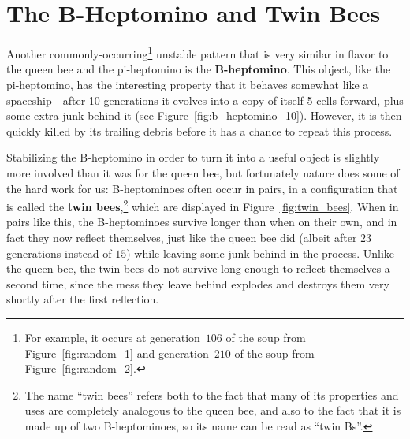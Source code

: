 \section{The B-Heptomino and Twin Bees}\label{sec:twin_bees}

Another commonly-occurring\footnote{For example, it occurs at generation~$106$ of the soup from Figure~\ref{fig:random_1} and generation~$210$ of the soup from Figure~\ref{fig:random_2}.} unstable pattern that is very similar in flavor to the queen bee and the pi-heptomino is the \textbf{B-heptomino}. This object, like the pi-heptomino, has the interesting property that it behaves somewhat like a spaceship---after 10 generations it evolves into a copy of itself 5 cells forward, plus some extra junk behind it (see Figure~\ref{fig:b_heptomino_10}). However, it is then quickly killed by its trailing debris before it has a chance to repeat this process.

Stabilizing the B-heptomino in order to turn it into a useful object is slightly more involved than it was for the queen bee, but fortunately nature does some of the hard work for us: B-heptominoes often occur in pairs, in a configuration that is called the \textbf{twin bees},\footnote{The name ``twin bees'' refers both to the fact that many of its properties and uses are completely analogous to the queen bee, and also to the fact that it is made up of two B-heptominoes, so its name can be read as ``twin Bs''.} which are displayed in Figure~\ref{fig:twin_bees}. When in pairs like this, the B-heptominoes survive longer than when on their own, and in fact they now reflect themselves, just like the queen bee did (albeit after $23$ generations instead of $15$) while leaving some junk behind in the process. Unlike the queen bee, the twin bees do not survive long enough to reflect themselves a second time, since the mess they leave behind explodes and destroys them very shortly after the first reflection.

